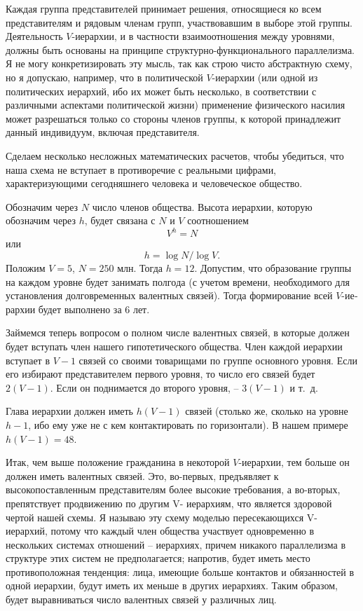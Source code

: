 \documentclass{book}
\begin{document}
Каждая группа представителей принимает решения, относя­щиеся ко всем представителям и рядовым членам групп, участ­вовавшим в выборе этой группы. Деятельность $V$-иерархии, и в частности взаимоотношения между уровнями, должны быть основаны на принципе структурно-функционального паралле­лизма. Я не могу конкретизировать эту мысль, так как строю чисто абстрактную схему, но я допускаю, например, что в политической $V$-иерархии (или одной из политических иерархий, ибо их может быть несколько, в соответствии с различными ас­пектами политической жизни) применение физического наси­лия может разрешаться только со стороны членов группы, к которой принадлежит данный индивидуум, включая представи­теля.

Сделаем несколько несложных математических расчетов, чтобы убедиться, что наша схема не вступает в противоречие с реальными цифрами, характеризующими сегодняшнего чело­века и человеческое общество.

Обозначим через $N$  число членов общества. Высота иерархии, которую обозначим через $h$,  будет связана с $N$ и $V$  соотноше­нием
\[
	V^h=N
\]
или 
\[
	h = \log N / \log V. 
\]
Положим $V=5$, $N=250$ млн. Тогда $h=12$.  Допустим, что образование группы на каждом уровне будет занимать полго­да (с учетом времени, необходимого для установления долго­временных валентных связей). Тогда формирование всей $V$-ие­рархии будет выполнено за 6 лет.

Займемся теперь вопросом о полном числе валентных связей, в которые должен будет вступать член нашего гипотетического общества. Член каждой иерархии вступает в $V-1$  связей со свои­ми товарищами по группе основного уровня. Если его избирают представителем первого уровня, то число его связей будет $2(V-1)$.  Если он поднимается до второго уровня, -- $3(V-1)$  и т.~д.

Глава иерархии должен иметь $h(V-1)$  связей (столько же, сколько на уровне $h - 1$, ибо ему уже не с кем контактировать по горизонтали). В нашем примере $h (V - 1) = 48$.

Итак, чем выше положение гражданина в некоторой $V$-иерар­хии, тем больше он должен иметь валентных связей. Это, во-первых, предъявляет к высокопоставленным представителям более высокие требования, а во-вторых, препятствует продви­жению по другим V-  иерархиям, что является здоровой чертой нашей схемы. Я называю эту схему моделью пересекающихся V-  иерархий, потому что каждый член общества участвует од­новременно в нескольких системах отношений -- иерархиях, причем никакого параллелизма в структуре этих систем не предполагается; напротив, будет иметь место противоположная тенденция: лица, имеющие больше контактов и обязанностей в одной иерархии, будут иметь их меньше в других иерархиях. Таким образом, будет выравниваться число валентных связей у различных лиц.
\end{document}
